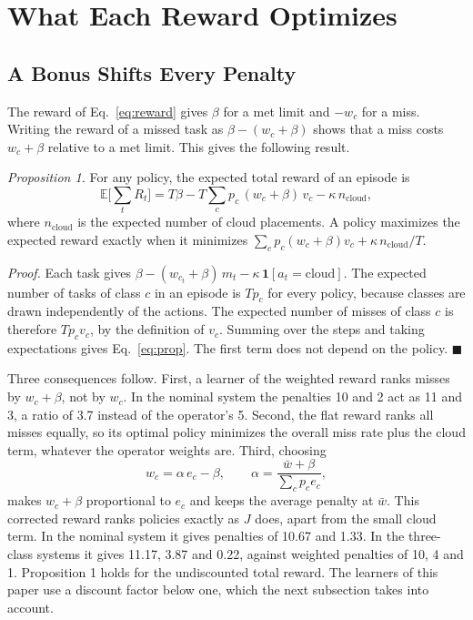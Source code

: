 \documentclass[journal]{IEEEtran}
\begin{document}
\section{What Each Reward Optimizes}
\label{sec:reward}

\subsection{A Bonus Shifts Every Penalty}
The reward of Eq.~\eqref{eq:reward} gives $\beta$ for a met limit and $-w_c$ for a miss. Writing the reward of a missed task as $\beta - (w_c + \beta)$ shows that a miss costs $w_c + \beta$ relative to a met limit. This gives the following result.

\emph{Proposition 1.} For any policy, the expected total reward of an episode is
\begin{equation}
\mathbb{E}\Big[\sum_{t} R_t\Big] = T\beta - T\sum_c p_c\,(w_c + \beta)\, v_c - \kappa\, n_\text{cloud},
\label{eq:prop}
\end{equation}
where $n_\text{cloud}$ is the expected number of cloud placements. A policy maximizes the expected reward exactly when it minimizes $\sum_c p_c (w_c + \beta) v_c + \kappa\, n_\text{cloud}/T$.

\emph{Proof.} Each task gives $\beta - (w_{c_t} + \beta)\, m_t - \kappa\,\mathbf{1}[a_t=\text{cloud}]$. The expected number of tasks of class $c$ in an episode is $T p_c$ for every policy, because classes are drawn independently of the actions. The expected number of misses of class $c$ is therefore $T p_c v_c$, by the definition of $v_c$. Summing over the steps and taking expectations gives Eq.~\eqref{eq:prop}. The first term does not depend on the policy. \hfill$\blacksquare$

Three consequences follow. First, a learner of the weighted reward ranks misses by $w_c + \beta$, not by $w_c$. In the nominal system the penalties 10 and 2 act as 11 and 3, a ratio of 3.7 instead of the operator's 5. Second, the flat reward ranks all misses equally, so its optimal policy minimizes the overall miss rate plus the cloud term, whatever the operator weights are. Third, choosing
\begin{equation}
w_c = \alpha\, e_c - \beta, \qquad \alpha = \frac{\bar w + \beta}{\sum_c p_c e_c},
\label{eq:corrected}
\end{equation}
makes $w_c + \beta$ proportional to $e_c$ and keeps the average penalty at $\bar w$. This corrected reward ranks policies exactly as $J$ does, apart from the small cloud term. In the nominal system it gives penalties of 10.67 and 1.33. In the three-class systems it gives 11.17, 3.87 and 0.22, against weighted penalties of 10, 4 and 1. Proposition 1 holds for the undiscounted total reward. The learners of this paper use a discount factor below one, which the next subsection takes into account.
\end{document}
